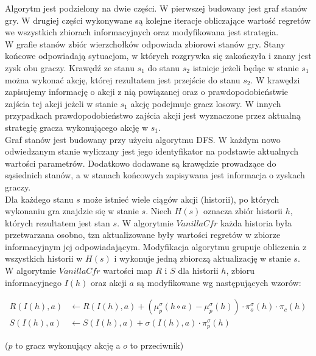 \documentclass[licencjacka]{pracamgr}
\begin{document}
\noindent
Algorytm jest podzielony na dwie części. W pierwszej budowany jest graf stanów gry. W drugiej części
wykonywane są kolejne iteracje obliczające wartość regretów we wszystkich zbiorach informacyjnych oraz
modyfikowana jest strategia. \\

\noindent
W grafie stanów zbiór wierzchołków odpowiada zbiorowi stanów gry. Stany końcowe odpowiadają
sytuacjom, w których rozgrywka się zakończyła i znany jest zysk obu graczy. Krawędź ze stanu $s_1$ do stanu $s_2$
istnieje jeżeli będąc w stanie $s_1$ można wykonać akcję, której rezultatem jest przejście do stanu
$s_2$. W krawędzi zapisujemy informację o akcji z nią powiązanej oraz o prawdopodobieństwie zajścia
tej akcji jeżeli w stanie $s_1$ akcję podejmuje gracz losowy. W innych przypadkach prawdopodobieństwo
zajścia akcji jest wyznaczone przez aktualną strategię gracza wykonującego akcję w $s_1$. \\

\noindent
Graf stanów jest budowany przy użyciu algorytmu DFS. W każdym nowo odwiedzanym stanie
wyliczany jest jego identyfikator na podstawie aktualnych wartości parametrów. Dodatkowo dodawane
są krawędzie prowadzące do sąsiednich stanów, a w stanach końcowych zapisywana jest informacja o
zyskach graczy. \\

\noindent
Dla każdego stanu $s$ może istnieć wiele ciągów akcji (historii), po których wykonaniu gra
znajdzie się w stanie $s$. Niech $H(s)$ oznacza zbiór historii $h$, których rezultatem jest stan $s$.
W algorytmie $VanillaCfr$ każda historia była przetwarzana osobno, tzn aktualizowane były wartości
regretów w zbiorze informacyjnym jej odpowiadającym. Modyfikacja algorytmu grupuje obliczenia z
wszystkich historii w $H(s)$ i wykonuje jedną zbiorczą aktualizację w stanie $s$. \\

\noindent
W algorytmie $VanillaCfr$ wartości map $R$ i $S$ dla historii $h$, zbioru informacyjnego $I(h)$ oraz akcji $a$ są modyfikowane
wg następujących wzorów:

\begin{align*}
R(I(h), a) &\leftarrow R(I(h), a) + (\mu_p^{\sigma}(h \circ a) - \mu_p^{\sigma}(h)) \cdot \pi_{o}^{\sigma}(h) \cdot \pi_c(h) \\
S(I(h), a) &\leftarrow S(I(h), a) + \sigma(I(h), a) \cdot \pi_p^{\sigma}(h)
\end{align*}

\noindent
($p$ to gracz wykonujący akcję a $o$ to przeciwnik) \\
\end{document}
